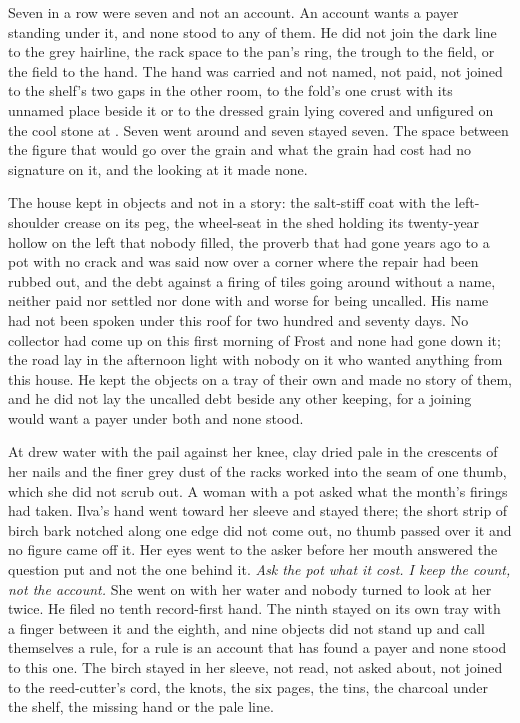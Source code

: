 Seven in a row were seven and not an account. An account wants a payer standing under it, and none stood to any of them. He did not join the dark line to the grey hairline, the rack space to the pan's ring, the trough to the field, or the field to the hand. The hand was carried and not named, not paid, not joined to the shelf's two gaps in the other room, to the fold's one crust with its unnamed place beside it or to the dressed grain lying covered and unfigured on the cool stone at . Seven went around and seven stayed seven. The space between the figure that would go over the grain and what the grain had cost had no signature on it, and the looking at it made none.

\scenebreak

The house kept  in objects and not in a story: the salt-stiff coat with the left-shoulder crease on its peg, the wheel-seat in the shed holding its twenty-year hollow on the left that nobody filled, the proverb that had gone years ago to a pot with no crack and was said now over a corner where the repair had been rubbed out, and the debt against a firing of tiles going around without a name, neither paid nor settled nor done with and worse for being uncalled. His name had not been spoken under this roof for two hundred and seventy days. No collector had come up  on this first morning of Frost and none had gone down it; the road lay in the afternoon light with nobody on it who wanted anything from this house. He kept the objects on a tray of their own and made no story of them, and he did not lay the uncalled debt beside any other keeping, for a joining would want a payer under both and none stood.

At   drew water with the pail against her knee, clay dried pale in the crescents of her nails and the finer grey dust of the racks worked into the seam of one thumb, which she did not scrub out. A woman with a pot asked what the month's firings had taken. Ilva's hand went toward her sleeve and stayed there; the short strip of birch bark notched along one edge did not come out, no thumb passed over it and no figure came off it. Her eyes went to the asker before her mouth answered the question put and not the one behind it. \emph{Ask the pot what it cost. I keep the count, not the account.} She went on with her water and nobody turned to look at her twice. He filed no tenth record-first hand. The ninth stayed on its own tray with a finger between it and the eighth, and nine objects did not stand up and call themselves a rule, for a rule is an account that has found a payer and none stood to this one. The birch stayed in her sleeve, not read, not asked about, not joined to the reed-cutter's cord, the knots, the six pages, the tins, the charcoal under the shelf, the missing hand or the pale line.

